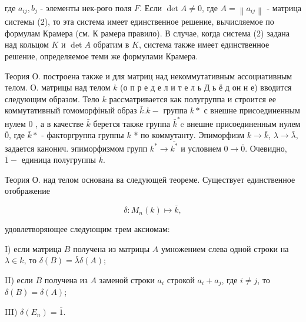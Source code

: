 \documentclass[10pt]{article}
\begin{document}
где $a_{i j}, b_{j}$ - элементы нек-рого поля $F$. Если $\operatorname{det} A \neq 0$, где $A=\left\|a_{i j}\right\|$ - матрица системы (2), то эта система имеет единственное решение, вычисляемое по формулам Крамера (см. К рамера правило). В случае, когда система (2) задана над кольцом $K$ и $\operatorname{det} A$ обратим в $K$, система также имеет единственное решение, определяемое теми же формулами Крамера.



Теория О. построена также и для матриц над некоммутативным ассоциативным телом. О. матрицы над телом $k$ (о п р е д е л и т е л ь Д ь ё д он н е) вводится следующим образом. Тело $k$ рассматривается как полугруппа и строится ее коммутативный гомоморфіный образ $\bar{k} . k-$ группа $k *$ с внешне присоединенным нулем 0 , а в качестве $\bar{k}$ берется также группа $\bar{k}^{*} \mathrm{c}$ внешне присоединенным нулем $\overline{0}$, где $\bar{k} *$ - факторгруппа группы $k$ * по коммутанту. Эпиморфизм $k \rightarrow \bar{k}$, $\lambda \rightarrow \bar{\lambda}$, задается канонич. эпиморфизмом групп $k^{*} \rightarrow \overline{k^{*}}$ и условием $0 \rightarrow \overline{0}$. Очевидно, $\overline{1}-$ единица полугруппы $\bar{k}$.



Теория О. над телом основана ва следующей теореме. Существует единственное отображение



\[

\delta: M_{n}(k) \mapsto \bar{k},

\]



удовлетворяющее следующим трем аксиомам:



I) если матрица $B$ получена из матрицы $A$ умножением слева одной строки на $\lambda \in k$, то $\delta(B)=\bar{\lambda} \delta(A)$;



II) если $B$ получена из $A$ заменой строки $a_{i}$ строкой $a_{i}+a_{j}$, где $i \neq j$, то $\delta(B)=\delta(A)$;



III) $\delta\left(E_{n}\right)=\overline{1}$.
\end{document}
